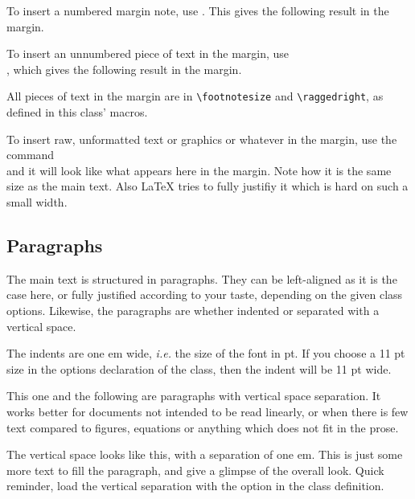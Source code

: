\documentclass[
	a4paper,
	raggedright,
	twoside,
	12pt,
	colorful,
]{tufte-style-article}
\begin{document}
To insert a numbered margin note, use . This gives the following result in the margin.

To insert an unnumbered piece of text in the margin, use\\\noindent{}, which gives the following result in the margin.

All pieces of text in the margin are in \texttt{\textbackslash footnotesize} and \texttt{\textbackslash raggedright}, as defined in this class' macros.

To insert raw, unformatted text or graphics or whatever in the margin, use the command\\  and it will look like what appears here in the margin. Note how it is the same size as the main text. Also \LaTeX{} tries to fully justifiy it which is hard on such a small width.


\subsection{Paragraphs}

The main text is structured in paragraphs. They can be left-aligned as it is the case here, or fully justified according to your taste, depending on the given class options. Likewise, the paragraphs are whether indented or separated with a vertical space.

The indents are one em wide, \textit{i.e.} the size of the font in pt. If you choose a 11 pt size in the options declaration of the class, then the indent will be 11 pt wide.

\begingroup
\setlength{\parindent}{0em}
\setlength{\parskip}{1em}
This one and the following are paragraphs with vertical space separation. It works better for documents not intended to be read linearly, or when there is few text compared to figures, equations or anything which does not fit in the prose.

The vertical space looks like this, with a separation of one em. This is just some more text to fill the paragraph, and give a glimpse of the overall look. Quick reminder, load the vertical separation with the  option in the class definition.
\endgroup
\end{document}
